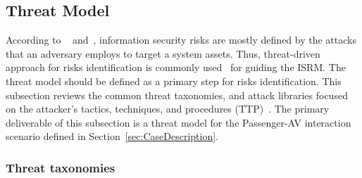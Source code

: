\documentclass[manuscript]{acmart}
\begin{document}
\subsection{Threat Model} \label{sec:ThreatModel}

According to ~\cite{ThreatModeling_Shostack} and~\cite{FundSecSysMod_RaimMat}, information security risks are mostly defined by the attacks that an adversary employs to target a system assets. Thus, threat-driven approach for risks identification is commonly used~\cite{InfoSec_4thEdition, ThreatModeling_Shostack} for guiding the ISRM. The threat model should be defined as a primary step for risks identification. This subsection reviews the common threat taxonomies, and attack libraries focused on the attacker's tactics, techniques, and procedures (TTP)~\cite{CyberThreatModSurvey}. The primary deliverable of this subsection is a threat model for the Passenger-AV interaction scenario defined in Section~\ref{sec:CaseDescription}. %

\subsubsection{Threat taxonomies} 
\end{document}
